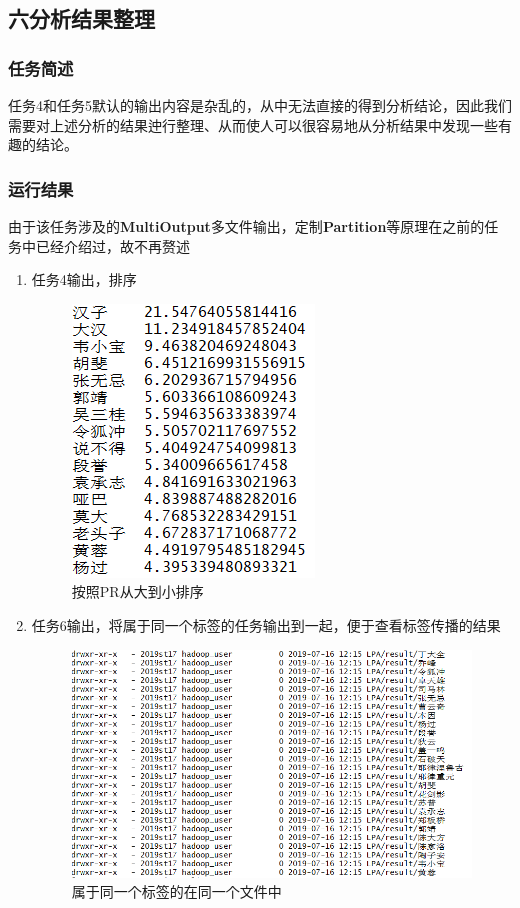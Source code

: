 \documentclass{ctexart}
\begin{document}
	
	
	
	
	\subsection{六\quad 分析结果整理}
	\subsubsection{任务简述}
	\par 任务4和任务5默认的输出内容是杂乱的，从中无法直接的得到分析结论，因此我们需要对上述分析的结果迚行整理、从而使人可以很容易地从分析结果中发现一些有趣的结论。
	\subsubsection{运行结果}
	\par 由于该任务涉及的\textbf{MultiOutput}多文件输出，定制\textbf{Partition}等原理在之前的任务中已经介绍过，故不再赘述
	\begin{enumerate}[I]
		\item 任务4输出，排序
		\begin{figure}[H]
			\centering
			\includegraphics[width=0.3\linewidth]{pic/task6/PR}
			\caption{按照PR从大到小排序}
			\label{fig:pr}
		\end{figure}
		
		\item 任务6输出，将属于同一个标签的任务输出到一起，便于查看标签传播的结果
		\begin{figure}[H]
			\centering
			\includegraphics[width=0.8\linewidth]{pic/task6/LPA}
			\caption{属于同一个标签的在同一个文件中}
			\label{fig:lpa}
		\end{figure}
		
	\end{enumerate}
	
\end{document}
